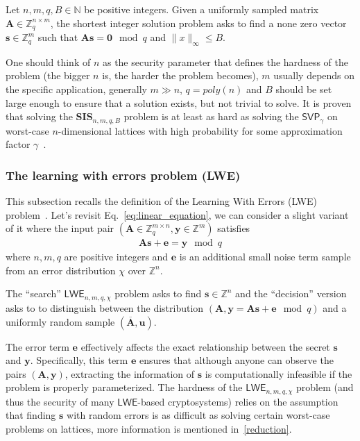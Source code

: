 \documentclass[cryptography,review,submit,pdftex,moreauthors,amsmath,amssymb,aps,strict]{Definitions/mdpi}
\begin{document}
\begin{Definition}
    Let $n,m,q, B \in \mathbb{N}$ be positive integers. Given a uniformly sampled matrix $\mathbf{A}\in\mathbb{Z}^{n\times m}_q$, the shortest integer solution problem asks to find a none zero vector $\mathbf{s}\in\mathbb{Z}^m_q$ such that $\mathbf{A}\mathbf{s}=\mathbf{0}\mod q$ and $\|x\|_{\infty}\leq B$.
\end{Definition}

One should think of $n$ as the security parameter that defines the hardness of the problem (the bigger $n$ is, the harder the problem becomes), $m$ usually depends on the specific application, generally $m\gg n$, $q=poly(n)$ and $B$ should be set large enough to ensure that a solution exists, but not trivial to solve. It is proven that solving the $\mathbf{SIS}_{n,m,q, B}$ problem is at least as hard as solving the $\mathsf{SVP}_{\gamma}$ on worst-case $n$-dimensional lattices with high probability for some approximation factor $\gamma$~\cite{Pei16}.


\subsubsection{The learning with errors problem (LWE)}
This subsection recalls the definition of the Learning With Errors (LWE) problem~\cite{Pei16}. Let's revisit Eq.~\eqref{eq:linear_equation}, we can consider a slight variant of it where the input pair $(\mathbf{A}\in \mathbb{Z}^{m\times n}_q, \mathbf{y} \in \mathbb{Z}^m)$ satisfies
\begin{align}
    \mathbf{A}\mathbf{s} + \mathbf{e}= \mathbf{y}\mod q \label{eq:lwe}
\end{align}
where $n, m, q$ are positive integers and $\mathbf{e}$ is an additional small noise term sample from an error distribution $\chi$ over $\mathbb{Z}^n$. 

The ``search'' $\mathsf{LWE}_{n,m,q,\chi}$ problem asks to find $\mathbf{s}\in\mathbb{Z}^n$ and the ``decision'' version asks to to distinguish between the distribution $ (\mathbf{A},\mathbf{y}=\mathbf{A}\mathbf{s}+\mathbf{e} \mod q)$ and a uniformly random sample $(\overline{\mathbf{A}},\mathbf{u})$.

The error term $\mathbf{e}$ effectively affects the exact relationship between the secret $\mathbf{s}$ and $\mathbf{y}$. Specifically, this term $\mathbf{e}$ ensures that although anyone can observe the pairs $(\mathbf{A},\mathbf{y})$, extracting the information of $\mathbf{s}$ is computationally infeasible if the problem is properly parameterized. The hardness of the $\mathsf{LWE}_{n,m,q,\chi}$ problem (and thus the security of many $\mathsf{LWE}$-based cryptosystems) relies on the assumption that finding $\mathbf{s}$ with random errors is as difficult as solving certain worst-case problems on lattices, more information is mentioned in~\ref{reduction}.
\end{document}
